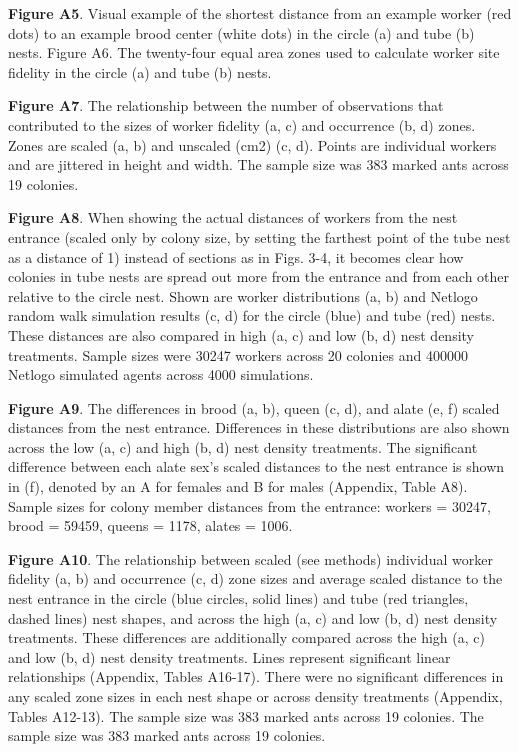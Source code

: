 \documentclass[3p]{elsarticle} %
\begin{document}
\textbf{Figure A5}. Visual example of the shortest distance from an
example worker (red dots) to an example brood center (white dots) in the
circle (a) and tube (b) nests. Figure A6. The twenty-four equal area
zones used to calculate worker site fidelity in the circle (a) and tube
(b) nests.

\textbf{Figure A7}. The relationship between the number of observations
that contributed to the sizes of worker fidelity (a, c) and occurrence
(b, d) zones. Zones are scaled (a, b) and unscaled (cm2) (c, d). Points
are individual workers and are jittered in height and width. The sample
size was 383 marked ants across 19 colonies.

\textbf{Figure A8}. When showing the actual distances of workers from
the nest entrance (scaled only by colony size, by setting the farthest
point of the tube nest as a distance of 1) instead of sections as in
Figs. 3-4, it becomes clear how colonies in tube nests are spread out
more from the entrance and from each other relative to the circle nest.
Shown are worker distributions (a, b) and Netlogo random walk simulation
results (c, d) for the circle (blue) and tube (red) nests. These
distances are also compared in high (a, c) and low (b, d) nest density
treatments. Sample sizes were 30247 workers across 20 colonies and
400000 Netlogo simulated agents across 4000 simulations.

\textbf{Figure A9}. The differences in brood (a, b), queen (c, d), and
alate (e, f) scaled distances from the nest entrance. Differences in
these distributions are also shown across the low (a, c) and high (b, d)
nest density treatments. The significant difference between each alate
sex's scaled distances to the nest entrance is shown in (f), denoted by
an A for females and B for males (Appendix, Table A8). Sample sizes for
colony member distances from the entrance: workers = 30247, brood =
59459, queens = 1178, alates = 1006.

\textbf{Figure A10}. The relationship between scaled (see methods)
individual worker fidelity (a, b) and occurrence (c, d) zone sizes and
average scaled distance to the nest entrance in the circle (blue
circles, solid lines) and tube (red triangles, dashed lines) nest
shapes, and across the high (a, c) and low (b, d) nest density
treatments. These differences are additionally compared across the high
(a, c) and low (b, d) nest density treatments. Lines represent
significant linear relationships (Appendix, Tables A16-17). There were
no significant differences in any scaled zone sizes in each nest shape
or across density treatments (Appendix, Tables A12-13). The sample size
was 383 marked ants across 19 colonies. The sample size was 383 marked
ants across 19 colonies.
\end{document}

